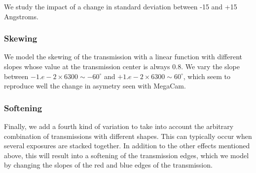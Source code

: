\documentclass{article}
\begin{document}
We study the impact of a change in standard deviation between -15 and
+15 Angstroms.

\hypertarget{skewing}{%
\subsubsection{Skewing}\label{skewing}}

We model the skewing of the transmission with a linear function with
different slopes whose value at the transmission center is always 0.8.
We vary the slope between \(-1.e-2\times6300\sim-60^{\circ}\) and
\(+1.e-2\times6300\sim60^{\circ}\), which seem to reproduce well the
change in asymetry seen with MegaCam.

\hypertarget{softening}{%
\subsubsection{Softening}\label{softening}}

Finally, we add a fourth kind of variation to take into account the
arbitrary combination of transmissions with different shapes. This can
typically occur when several exposures are stacked together. In addition
to the other effects mentioned above, this will result into a softening
of the transmission edges, which we model by changing the slopes of the
red and blue edges of the transmission.



    \begin{center}
    \end{center}
    { \hspace*{\fill} \\}
    
    \begin{center}
    \end{center}
    { \hspace*{\fill} \\}
    
    \begin{center}
    \end{center}
    { \hspace*{\fill} \\}
    
\end{document}
